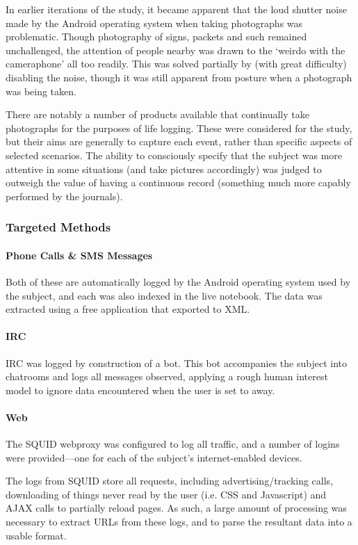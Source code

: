 In earlier iterations of the study, it became apparent that the loud shutter noise made by the Android operating system when taking photographs was problematic.  Though photography of signs, packets and such remained unchallenged, the attention of people nearby was drawn to the `weirdo with the cameraphone' all too readily.  This was solved partially by (with great difficulty) disabling the noise, though it was still apparent from posture when a photograph was being taken.

There are notably a number of products available that continually take photographs for the purposes of life logging.  These were considered for the study, but their aims are generally to capture each event, rather than specific aspects of selected scenarios.  The ability to consciously specify that the subject was more attentive in some situations (and take pictures accordingly) was judged to outweigh the value of having a continuous record (something much more capably performed by the journals).




\subsubsection{Targeted Methods}
\paragraph{Phone Calls \& SMS Messages}
Both of these are automatically logged by the Android operating system used by the subject, and each was also indexed in the live notebook.  The data was extracted using a free application that exported to XML.


\paragraph{IRC}
IRC was logged by construction of a bot.  This bot accompanies the subject into chatrooms and logs all messages observed, applying a rough human interest model to ignore data encountered when the user is set to away.


\paragraph{Web}
The SQUID webproxy was configured to log all traffic, and a number of logins were provided---one for each of the subject's internet-enabled devices.

The logs from SQUID store all requests, including advertising/tracking calls, downloading of things never read by the user (i.e. CSS and Javascript) and AJAX calls to partially reload pages.  As such, a large amount of processing was necessary to extract URLs from these logs, and to parse the resultant data into a usable format.


